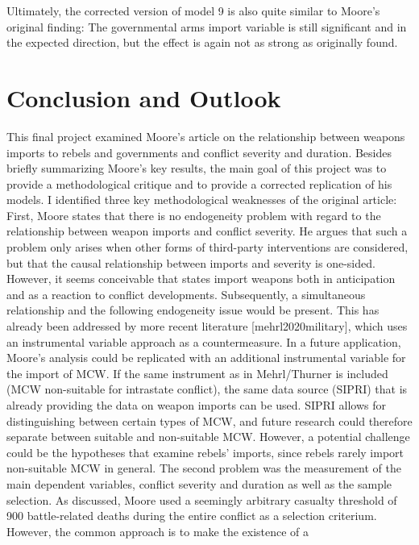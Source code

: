 \documentclass[
]{article}
\begin{document}
Ultimately, the corrected version of model 9 is also quite similar to
Moore's original finding: The governmental arms import variable is still
significant and in the expected direction, but the effect is again not
as strong as originally found.

\hypertarget{conclusion-and-outlook}{%
\section{Conclusion and Outlook}\label{conclusion-and-outlook}}

This final project examined Moore's article on the relationship between
weapons imports to rebels and governments and conflict severity and
duration. Besides briefly summarizing Moore's key results, the main goal
of this project was to provide a methodological critique and to provide
a corrected replication of his models. I identified three key
methodological weaknesses of the original article: First, Moore states
that there is no endogeneity problem with regard to the relationship
between weapon imports and conflict severity. He argues that such a
problem only arises when other forms of third-party interventions are
considered, but that the causal relationship between imports and
severity is one-sided. However, it seems conceivable that states import
weapons both in anticipation and as a reaction to conflict developments.
Subsequently, a simultaneous relationship and the following endogeneity
issue would be present. This has already been addressed by more recent
literature {[}mehrl2020military{]}, which uses an instrumental variable
approach as a countermeasure. In a future application, Moore's analysis
could be replicated with an additional instrumental variable for the
import of MCW. If the same instrument as in Mehrl/Thurner is included
(MCW non-suitable for intrastate conflict), the same data source (SIPRI)
that is already providing the data on weapon imports can be used. SIPRI
allows for distinguishing between certain types of MCW, and future
research could therefore separate between suitable and non-suitable MCW.
However, a potential challenge could be the hypotheses that examine
rebels' imports, since rebels rarely import non-suitable MCW in general.
The second problem was the measurement of the main dependent variables,
conflict severity and duration as well as the sample selection. As
discussed, Moore used a seemingly arbitrary casualty threshold of 900
battle-related deaths during the entire conflict as a selection
criterium. However, the common approach is to make the existence of a
\end{document}
